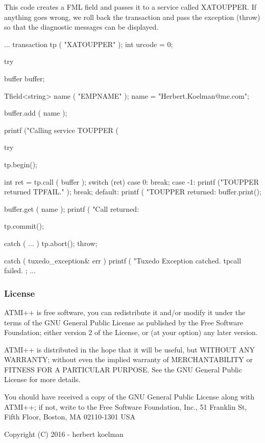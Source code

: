 This code creates a F\+M\+L field and passes it to a service called {\ttfamily X\+A\+T\+O\+U\+P\+P\+E\+R}. If anything goes wrong, we roll back the transaction and pass the exception ({\ttfamily throw}) so that the diagnostic messages can be displayed. \begin{DoxyVerb}    ...
    transaction tp ( "XATOUPPER" );
    int urcode = 0;

    try {

      buffer buffer;

      Tfield<string> name ( "EMPNAME" );
      name = "Herbert.Koelman@me.com";

      buffer.add ( name );

      printf ("Calling service TOUPPER (%

      try {

        tp.begin();

        int ret = tp.call ( buffer );
        switch (ret) {
          case 0:
            break;
          case -1:
            printf ("TOUPPER returned TPFAIL.\n" );
            break;
          default:
            printf ( "TOUPPER returned: %
            buffer.print();
        }

        buffer.get ( name );
        printf ( "Call returned: %

        tp.commit();
      } catch ( ... ){
        tp.abort();
        throw;
      }

    } catch ( tuxedo_exception& err ) {
      printf ( "Tuxedo Exception catched. tpcall failed. %
    };
    ...
\end{DoxyVerb}


\subsubsection*{License}





A\+T\+M\+I++ is free software, you can redistribute it and/or modify it under the terms of the G\+N\+U General Public License as published by the Free Software Foundation; either version 2 of the License, or (at your option) any later version.

A\+T\+M\+I++ is distributed in the hope that it will be useful, but W\+I\+T\+H\+O\+U\+T A\+N\+Y W\+A\+R\+R\+A\+N\+T\+Y; without even the implied warranty of M\+E\+R\+C\+H\+A\+N\+T\+A\+B\+I\+L\+I\+T\+Y or F\+I\+T\+N\+E\+S\+S F\+O\+R A P\+A\+R\+T\+I\+C\+U\+L\+A\+R P\+U\+R\+P\+O\+S\+E. See the G\+N\+U General Public License for more details.

You should have received a copy of the G\+N\+U General Public License along with A\+T\+M\+I++; if not, write to the Free Software Foundation, Inc., 51 Franklin St, Fifth Floor, Boston, M\+A 02110-\/1301 U\+S\+A 

 Copyright (C) 2016 -\/ herbert koelman 